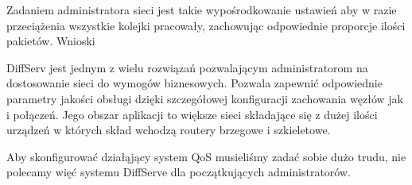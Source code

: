 \documentclass[a4paper]{article}
\begin{document}


Zadaniem administratora sieci jest takie wypośrodkowanie ustawień aby w razie przeciążenia wszystkie kolejki pracowały, zachowując odpowiednie proporcje ilości pakietów.
Wnioski


DiffServ jest jednym z wielu rozwiązań pozwalającym administratorom na dostosowanie sieci do wymogów biznesowych. Pozwala zapewnić odpowiednie parametry jakości obsługi dzięki szczegółowej konfiguracji zachowania węzłów jak i połączeń. Jego obszar aplikacji to większe sieci składające się z dużej ilości urządzeń w których skład wchodzą routery brzegowe i szkieletowe.

Aby skonfigurować działąjący system QoS musieliśmy zadać sobie dużo trudu, nie polecamy więć systemu DiffServe dla początkujących administratorów.
\end{document}
